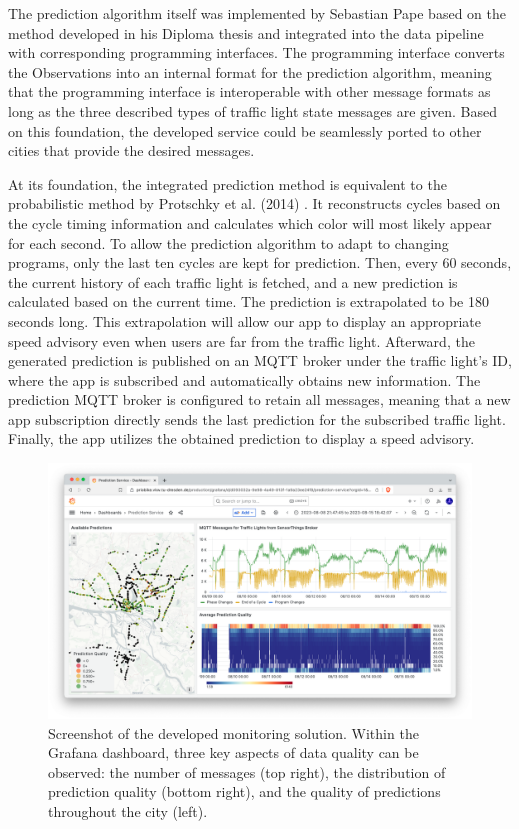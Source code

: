 The prediction algorithm itself was implemented by Sebastian Pape based on the method developed in his Diploma thesis \cite{pape_untersuchung_2012} and integrated into the data pipeline with corresponding programming interfaces. The programming interface converts the Observations into an internal format for the prediction algorithm, meaning that the programming interface is interoperable with other message formats as long as the three described types of traffic light state messages are given. Based on this foundation, the developed service could be seamlessly ported to other cities that provide the desired messages.

At its foundation, the integrated prediction method is equivalent to the probabilistic method by Protschky et al. (2014) \cite{protschky_extensive_2014, protschky_adaptive_2014}. It reconstructs cycles based on the cycle timing information and calculates which color will most likely appear for each second. To allow the prediction algorithm to adapt to changing programs, only the last ten cycles are kept for prediction. Then, every 60 seconds, the current history of each traffic light is fetched, and a new prediction is calculated based on the current time. The prediction is extrapolated to be 180 seconds long. This extrapolation will allow our app to display an appropriate speed advisory even when users are far from the traffic light. Afterward, the generated prediction is published on an MQTT broker under the traffic light's ID, where the app is subscribed and automatically obtains new information. The prediction MQTT broker is configured to retain all messages, meaning that a new app subscription directly sends the last prediction for the subscribed traffic light. Finally, the app utilizes the obtained prediction to display a speed advisory.

\begin{figure}[t]
\centering
\includegraphics[width=\linewidth]{images/monitoring-screenshot.png}
\caption{Screenshot of the developed monitoring solution. Within the Grafana dashboard, three key aspects of data quality can be observed: the number of messages (top right), the distribution of prediction quality (bottom right), and the quality of predictions throughout the city (left).}
\label{fig:monitoring-screenshot}
\end{figure}

